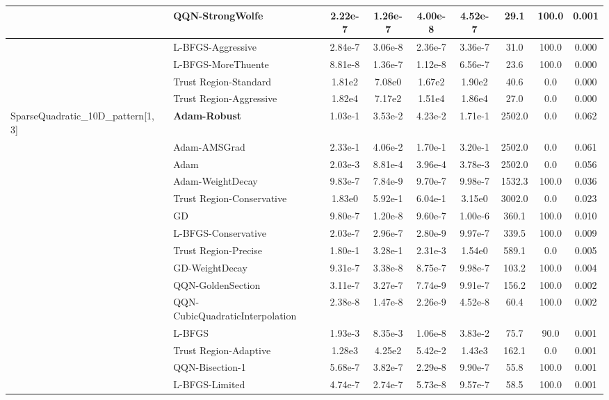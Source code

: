 \documentclass[10pt]{article}
\begin{document}
\begin{longtable}{|l|l|c|c|c|c|c|c|c|}
\hline
 & QQN-StrongWolfe & 2.22e-7 & 1.26e-7 & 4.00e-8 & 4.52e-7 & 29.1 & 100.0 & 0.001 \\
\hline
 & L-BFGS-Aggressive & 2.84e-7 & 3.06e-8 & 2.36e-7 & 3.36e-7 & 31.0 & 100.0 & 0.000 \\
\hline
 & L-BFGS-MoreThuente & 8.81e-8 & 1.36e-7 & 1.12e-8 & 6.56e-7 & 23.6 & 100.0 & 0.000 \\
\hline
 & Trust Region-Standard & 1.81e2 & 7.08e0 & 1.67e2 & 1.90e2 & 40.6 & 0.0 & 0.000 \\
\hline
 & Trust Region-Aggressive & 1.82e4 & 7.17e2 & 1.51e4 & 1.86e4 & 27.0 & 0.0 & 0.000 \\
SparseQuadratic\_10D\_pattern[1, 3] & \textbf{Adam-Robust} & 1.03e-1 & 3.53e-2 & 4.23e-2 & 1.71e-1 & 2502.0 & 0.0 & 0.062 \\
\hline
 & Adam-AMSGrad & 2.33e-1 & 4.06e-2 & 1.70e-1 & 3.20e-1 & 2502.0 & 0.0 & 0.061 \\
\hline
 & Adam & 2.03e-3 & 8.81e-4 & 3.96e-4 & 3.78e-3 & 2502.0 & 0.0 & 0.056 \\
\hline
 & Adam-WeightDecay & 9.83e-7 & 7.84e-9 & 9.70e-7 & 9.98e-7 & 1532.3 & 100.0 & 0.036 \\
\hline
 & Trust Region-Conservative & 1.83e0 & 5.92e-1 & 6.04e-1 & 3.15e0 & 3002.0 & 0.0 & 0.023 \\
\hline
 & GD & 9.80e-7 & 1.20e-8 & 9.60e-7 & 1.00e-6 & 360.1 & 100.0 & 0.010 \\
\hline
 & L-BFGS-Conservative & 2.03e-7 & 2.96e-7 & 2.80e-9 & 9.97e-7 & 339.5 & 100.0 & 0.009 \\
\hline
 & Trust Region-Precise & 1.80e-1 & 3.28e-1 & 2.31e-3 & 1.54e0 & 589.1 & 0.0 & 0.005 \\
\hline
 & GD-WeightDecay & 9.31e-7 & 3.38e-8 & 8.75e-7 & 9.98e-7 & 103.2 & 100.0 & 0.004 \\
\hline
 & QQN-GoldenSection & 3.11e-7 & 3.27e-7 & 7.74e-9 & 9.91e-7 & 156.2 & 100.0 & 0.002 \\
\hline
 & QQN-CubicQuadraticInterpolation & 2.38e-8 & 1.47e-8 & 2.26e-9 & 4.52e-8 & 60.4 & 100.0 & 0.002 \\
\hline
 & L-BFGS & 1.93e-3 & 8.35e-3 & 1.06e-8 & 3.83e-2 & 75.7 & 90.0 & 0.001 \\
\hline
 & Trust Region-Adaptive & 1.28e3 & 4.25e2 & 5.42e-2 & 1.43e3 & 162.1 & 0.0 & 0.001 \\
\hline
 & QQN-Bisection-1 & 5.68e-7 & 3.82e-7 & 2.29e-8 & 9.90e-7 & 55.8 & 100.0 & 0.001 \\
\hline
 & L-BFGS-Limited & 4.74e-7 & 2.74e-7 & 5.73e-8 & 9.57e-7 & 58.5 & 100.0 & 0.001 \\

\end{longtable}
\end{document}
